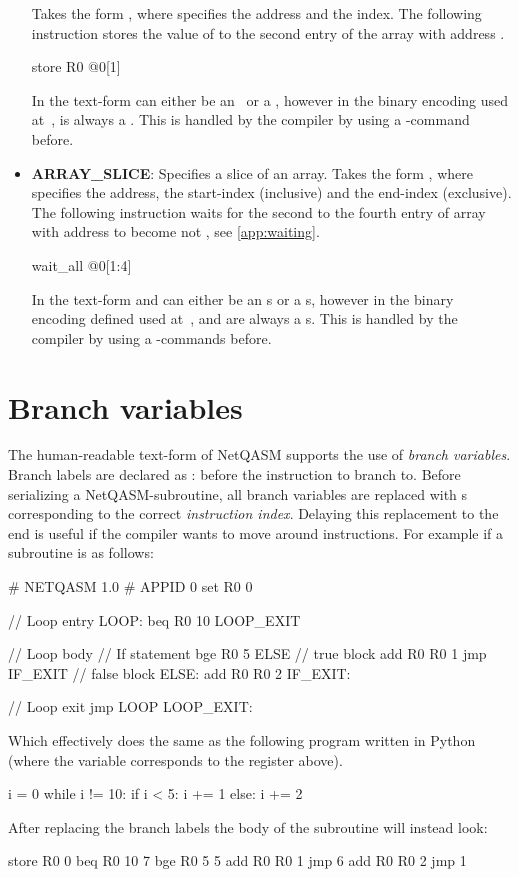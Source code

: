 \begin{itemize}
        Takes the form , where  specifies the address and  the index.
        The following instruction stores the value of  to the second entry of the array with address .
        \begin{nqcode}
store R0 @0[1]\end{nqcode}
        In the text-form  can either be an \IMMEDIATE\ or a \REGISTER, however in the binary encoding used at~\cite{git_netqasm},  is always a \REGISTER.
        This is handled by the compiler by using a -command before.
  \item \textbf{ARRAY\_SLICE}: Specifies a slice of an array.
        Takes the form , where  specifies the address,  the start-index (inclusive) and  the end-index (exclusive).
        The following instruction waits for the second to the fourth entry of array with address  to become not , see \cref{app:waiting}.
        \begin{nqcode}
wait_all @0[1:4]\end{nqcode}
        In the text-form  and  can either be an \IMMEDIATE{}s or a \REGISTER{}s, however in the binary encoding defined used at~\cite{git_netqasm},  and  are always a \REGISTER{}s.
        This is handled by the compiler by using a -commands before.
\end{itemize}

\section{Branch variables}
\label{netqasm:sec:branch_variables}
The human-readable text-form of \ac{NetQASM} supports the use of \emph{branch variables}.
Branch labels are declared as : before the instruction to branch to.
Before serializing a \ac{NetQASM}-subroutine, all branch variables are replaced with \IMMEDIATE{}s corresponding to the correct \emph{instruction index}.
Delaying this replacement to the end is useful if the compiler wants to move around instructions.
For example if a subroutine is as follows:
\begin{nqcode}
# NETQASM 1.0
# APPID 0
set R0 0

// Loop entry
LOOP:
beq R0 10 LOOP_EXIT

// Loop body
// If statement
bge R0 5 ELSE
// true block
add R0 R0 1
jmp IF_EXIT
// false block
ELSE:
add R0 R0 2
IF_EXIT:

// Loop exit
jmp LOOP
LOOP_EXIT:\end{nqcode}
Which effectively does the same as the following program written in Python (where the variable  corresponds to the register  above).
\begin{pycode}
i = 0
while i != 10:
  if i < 5:
    i += 1
  else:
    i += 2
\end{pycode}
After replacing the branch labels the body of the subroutine will instead look:
\begin{nqcode}
store R0 0
beq R0 10 7
bge R0 5 5
add R0 R0 1
jmp 6
add R0 R0 2
jmp 1\end{nqcode}

